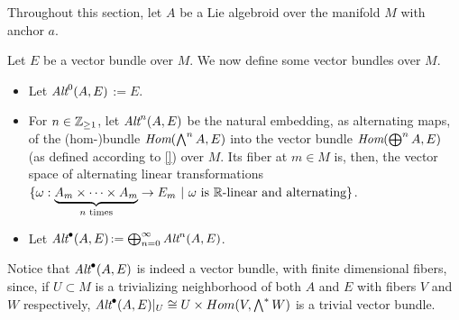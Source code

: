 \linea 

Throughout this section, let $A$ be a Lie algebroid over the manifold $M$ with anchor $a$.

\begin{definition}
Let $E$ be a vector bundle over $M$. We now define some vector bundles over $M$.
    \begin{itemize}
    
    \item Let \emph{$\operatorname{\textit{Alt}}^0(A, E)$}$:= E$. 
    
    \item For $n \in \mathbb{Z}_{\geq 1}$, let \emph{$\operatorname{\textit{Alt}}^n(A, E)$} be the natural embedding, as alternating maps, of the (hom-)bundle $\operatorname{\textit{Hom}}(\bigwedge^n A, E)$ into the vector bundle $\operatorname{\textit{Hom}}(\bigoplus^n A, E)$ (as defined according to \ref{}) over $M$. Its fiber at $m \in M$ is, then, the vector space of alternating linear transformations $\{\omega: \underbrace{A_m \times \cdots \times A_m}_{\text{$n$ times}} \to E_m \ |\  \text{$\omega$ is $\mathbb{R}$-linear and alternating}\}$.
    
    \item Let \emph{$\operatorname{\textit{Alt}}^\bullet(A, E)$}$:= \bigoplus^\infty_{n = 0} \operatorname{\textit{Alt}}^n(A, E)$.
    
        
    \end{itemize}
    
\end{definition}

Notice that $\operatorname{\textit{Alt}}^\bullet(A, E)$ is indeed a vector bundle, with finite dimensional fibers, since, if $U \subset M$ is a trivializing neighborhood of both $A$ and $E$ with fibers $V$ and $W$ respectively, $\operatorname{\textit{Alt}}^\bullet(A, E)|_U \cong U \times Hom(V, \bigwedge^* W)$ is a trivial vector bundle.

